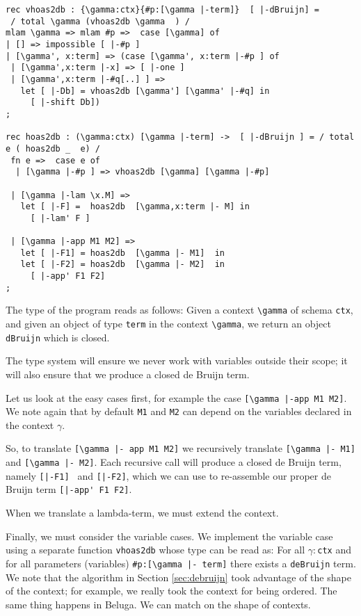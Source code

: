 \begin{lstlisting}
rec vhoas2db : {\gamma:ctx}{#p:[\gamma |-term]}  [ |-dBruijn] =
 / total \gamma (vhoas2db \gamma  ) /
mlam \gamma => mlam #p =>  case [\gamma] of
| [] => impossible [ |-#p ]
| [\gamma', x:term] => (case [\gamma', x:term |-#p ] of
 | [\gamma',x:term |-x] => [ |-one ]
 | [\gamma',x:term |-#q[..] ] =>
   let [ |-Db] = vhoas2db [\gamma'] [\gamma' |-#q] in
     [ |-shift Db])
;

rec hoas2db : (\gamma:ctx) [\gamma |-term] ->  [ |-dBruijn ] = / total e ( hoas2db _  e) /
 fn e =>  case e of
  | [\gamma |-#p ] => vhoas2db [\gamma] [\gamma |-#p]

 | [\gamma |-lam \x.M] =>
   let [ |-F] =  hoas2db  [\gamma,x:term |- M] in
     [ |-lam' F ]

 | [\gamma |-app M1 M2] =>
   let [ |-F1] = hoas2db  [\gamma |- M1]  in
   let [ |-F2] = hoas2db  [\gamma |- M2]  in
     [ |-app' F1 F2]
;
\end{lstlisting}

The type of the program reads as follows: Given a context
\lstinline!\gamma! of schema \lstinline!ctx!, and given an object of type
\lstinline!term! in the context \lstinline!\gamma!, we return an object
\lstinline!dBruijn! which is closed.

The type system will ensure we never work with variables outside their
scope; it will also ensure that we produce a closed de Bruijn term.

Let us look at the easy cases first, for example the case
\lstinline![\gamma |-app M1 M2]!.  We note again that by default \lstinline!M1! and \lstinline!M2! can depend on the variables declared in the context $\gamma$.

So, to translate \lstinline![\gamma |- app M1 M2]! we recursively
translate \lstinline![\gamma |- M1]! and \lstinline![\gamma |- M2]!. Each
recursive call will produce a closed de Bruijn term, namely
\lstinline![|-F1] ! and \lstinline![|-F2]!, which we can use to
re-assemble our proper de Bruijn term \lstinline![|-app' F1 F2]!.

When we translate a lambda-term, we must extend the context.


Finally, we must consider the variable cases. We implement the variable case using a separate function \lstinline!vhoas2db! whose type can be read as: For all $\gamma:$\lstinline!ctx! and for all parameters (variables) \lstinline!#p:[\gamma |- term]! there exists a \lstinline!deBruijn! term.  We note that the algorithm in Section \ref{sec:debruijn} 
took advantage of the shape of the context; for
example, we really took the context for being ordered. The same thing
happens in Beluga. We can match on the shape of contexts.


